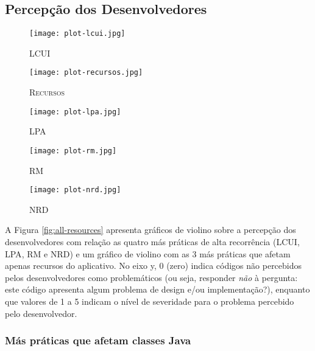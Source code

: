 \subsection{Percepção dos Desenvolvedores}

\begin{figure*}
\centering
\begin{subfigure}{.22\textwidth}
  \centering
  \texttt{[image: plot-lcui.jpg]}
  \caption{\textsc{LCUI}}
  \label{fig:lcui}
\end{subfigure}%
\begin{subfigure}{.17\textwidth}
  \centering
  \texttt{[image: plot-recursos.jpg]}
  \caption{\textsc{Recursos}}
  \label{fig:resources}
\end{subfigure}%
\begin{subfigure}{.17\textwidth}
  \centering
  \texttt{[image: plot-lpa.jpg]}
  \caption{\textsc{LPA}}
  \label{fig:lpa}
\end{subfigure}%
\begin{subfigure}{.17\textwidth}
  \centering
  \texttt{[image: plot-rm.jpg]}
  \caption{\textsc{RM}}
  \label{fig:rm}
\end{subfigure}
\begin{subfigure}{.17\textwidth}
  \centering
  \texttt{[image: plot-nrd.jpg]}
  \caption{\textsc{NRD}}
  \label{fig:nrd}
\end{subfigure}%
\caption{Gráficos violino das más práticas \textsc{LCUI}, \textsc{LPA}, \textsc{RM} e \textsc{NRD}.}
\label{fig:all-resources}
\vspace{-.5cm} 
\end{figure*}


A Figura \ref{fig:all-resources} apresenta gráficos de violino sobre a percepção dos desenvolvedores com relação as quatro más práticas de alta recorrência (\textsc{LCUI}, \textsc{LPA}, \textsc{RM} e \textsc{NRD}) e um gráfico de violino com as 3 más práticas que afetam apenas recursos do aplicativo. No eixo y, 0 (zero) indica códigos não percebidos pelos desenvolvedores como problemáticos (ou seja, responder \emph{não} à pergunta: este código apresenta algum problema de design e/ou implementação?), enquanto que valores de 1 a 5 indicam o nível de severidade para o problema percebido pelo desenvolvedor.

\subsubsection{Más práticas que afetam classes Java}

